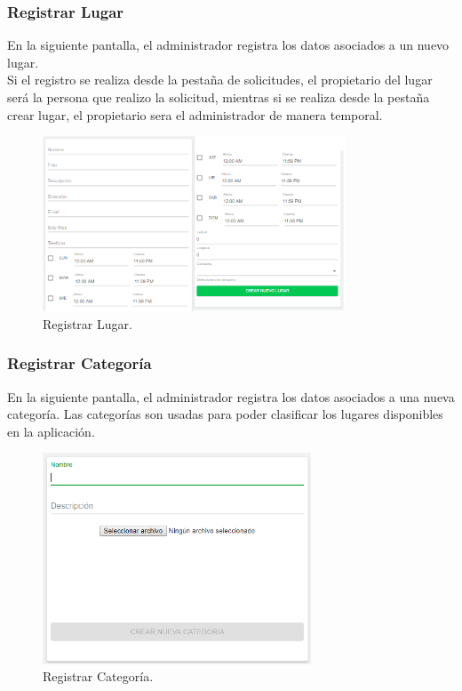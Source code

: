 \documentclass[12pt,letterpaper,openany]{book}
\begin{document}
\subsubsection{Registrar Lugar}
En la siguiente pantalla, el administrador registra los datos asociados a un nuevo lugar. \\
Si el registro se realiza desde la pestaña de solicitudes, el propietario del lugar será la persona que realizo la solicitud, mientras si se realiza desde la pestaña crear lugar, el propietario sera el administrador de manera temporal.

\begin{figure}[H]
\begin{center}
\includegraphics[width=9cm]{./imagenes/admin/crear_lugar}
\caption{Registrar Lugar.}
\end{center}
\end{figure}

\subsubsection{Registrar Categoría}
En la siguiente pantalla, el administrador registra los datos asociados a una nueva categoría.
Las categorías son usadas para poder clasificar los lugares disponibles en la aplicación.
\begin{figure}[H]
\begin{center}
\includegraphics[width=8cm]{./imagenes/admin/r_categoria}
\caption{Registrar Categoría.}
\end{center}
\end{figure}
\end{document}
